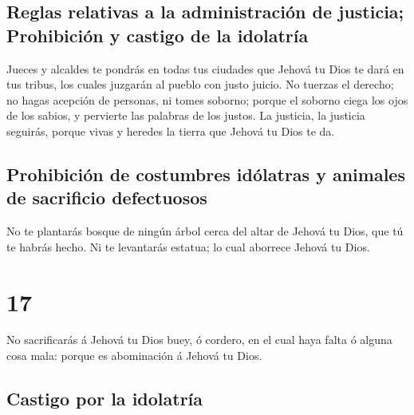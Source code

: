 \hypertarget{reglas-relativas-a-la-administraciuxf3n-de-justicia-prohibiciuxf3n-y-castigo-de-la-idolatruxeda}{%
\subsection{Reglas relativas a la administración de justicia;
Prohibición y castigo de la
idolatría}\label{reglas-relativas-a-la-administraciuxf3n-de-justicia-prohibiciuxf3n-y-castigo-de-la-idolatruxeda}}

 Jueces y alcaldes te pondrás en todas tus ciudades que
Jehová tu Dios te dará en tus tribus, los cuales juzgarán al pueblo con
justo juicio.  No tuerzas el derecho; no hagas acepción de
personas, ni tomes soborno; porque el soborno ciega los ojos de los
sabios, y pervierte las palabras de los justos.  La
justicia, la justicia seguirás, porque vivas y heredes la tierra que
Jehová tu Dios te da.

\hypertarget{prohibiciuxf3n-de-costumbres-iduxf3latras-y-animales-de-sacrificio-defectuosos}{%
\subsection{Prohibición de costumbres idólatras y animales de sacrificio
defectuosos}\label{prohibiciuxf3n-de-costumbres-iduxf3latras-y-animales-de-sacrificio-defectuosos}}

 No te plantarás bosque de ningún árbol cerca del altar de
Jehová tu Dios, que tú te habrás hecho.  Ni te levantarás
estatua; lo cual aborrece Jehová tu Dios.

\hypertarget{section-16}{%
\section{17}\label{section-16}}

 No sacrificarás á Jehová tu Dios buey, ó cordero, en el
cual haya falta ó alguna cosa mala: porque es abominación á Jehová tu
Dios.

\hypertarget{castigo-por-la-idolatruxeda}{%
\subsection{Castigo por la
idolatría}\label{castigo-por-la-idolatruxeda}}

